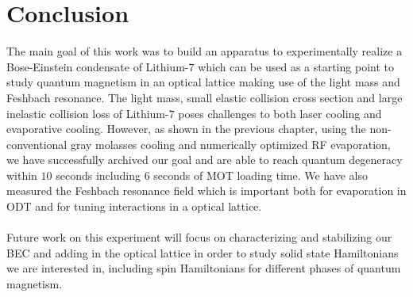 \chapter*{Conclusion}

The main goal of this work was to build an apparatus to experimentally realize a Bose-Einstein condensate of Lithium-$7$ which can be used as a starting point to study quantum magnetism in an optical lattice making use of the light mass and Feshbach resonance. The light mass, small elastic collision cross section and large inelastic collision loss of Lithium-$7$ poses challenges to both laser cooling and evaporative cooling. However, as shown in the previous chapter, using the non-conventional gray molasses cooling and numerically optimized RF evaporation, we have successfully archived our goal and are able to reach quantum degeneracy within $10$ seconds including $6$ seconds of MOT loading time. We have also measured the Feshbach resonance field which is important both for evaporation in ODT and for tuning interactions in a optical lattice.\\
\\
Future work on this experiment will focus on characterizing and stabilizing our BEC and adding in the optical lattice in order to study solid state Hamiltonians we are interested in, including spin Hamiltonians for different phases of quantum magnetism.
